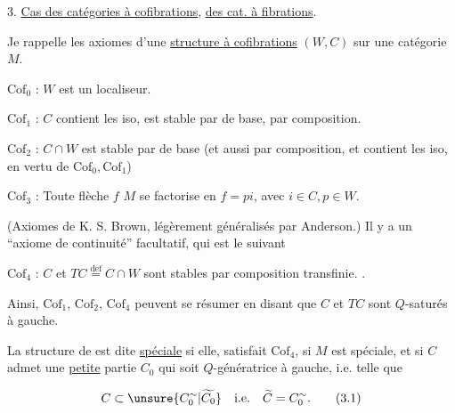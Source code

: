 
3. \uline{Cas des catégories à cofibrations}, \uline{des cat. à fibrations}.

Je rappelle les axiomes d'une \uline{structure à cofibrations}
$(W,C)$ sur une catégorie $M$.

$\mathrm{Cof}_0$ : $W$ est un localiseur.

$\mathrm{Cof}_1$ : $C$ contient les iso, est stable par 
de base, par composition.

$\mathrm{Cof}_2$ : $C\cap W$ est stable par  de base
(et aussi par composition, et contient les
iso, en vertu de $\mathrm{Cof}_0,\mathrm{Cof}_1$)

$\mathrm{Cof}_3$ : Toute flèche $f$  $M$ se factorise en
$f=pi$, avec $i\in C,p\in W$.

(Axiomes de K. S. Brown, légèrement généralisés
par Anderson.) Il y a un ``axiome de
continuité''  facultatif, qui est le suivant

$\mathrm{Cof}_4$ : 
$C$ et $TC\overset{\mathrm{def}}{=}C\cap W$ sont stables par
composition transfinie. .

Ainsi, $\mathrm{Cof}_1$, $\mathrm{Cof}_2$, $\mathrm{Cof}_4$ peuvent se résumer
en disant que $C$ et $TC$ sont $Q$-saturés
 à gauche.

La structure de  est dite
\uline{spéciale} si elle,  satisfait $\mathrm{Cof}_4$,
si $M$ est spéciale, et si $C$ admet
une \uline{petite} partie $C_0$ qui soit $Q$-génératrice
à gauche, i.e. telle que

\[
 C\subset \unsure{C_0^{\sim}|\widetilde{C_0}}\quad\text{i.e.}\quad\widetilde C=C_0^{\sim}.\tag*{(3.1)}
\]
